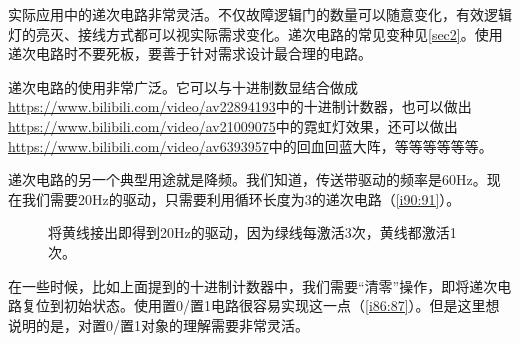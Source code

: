 实际应用中的递次电路非常灵活。不仅故障逻辑门的数量可以随意变化，有效逻辑灯的亮灭、接线方式都可以视实际需求变化。递次电路的常见变种见\autoref{sec2}。使用递次电路时不要死板，要善于针对需求设计最合理的电路。

递次电路的使用非常广泛。它可以与十进制数显结合做成\url{https://www.bilibili.com/video/av22894193}中的十进制计数器，也可以做出\url{https://www.bilibili.com/video/av21009075}中的霓虹灯效果，还可以做出\url{https://www.bilibili.com/video/av6393957}中的回血回蓝大阵，等等等等等等。

递次电路的另一个典型用途就是降频。我们知道，传送带驱动的频率是60Hz。现在我们需要20Hz的驱动，只需要利用循环长度为3的递次电路（\autoref{i90:91}）。

\begin{figure}[!h]
\begin{center}
\end{center}
\caption{将黄线接出即得到20Hz的驱动，因为绿线每激活3次，黄线都激活1次。}
\label{i90:91}
\end{figure}

在一些时候，比如上面提到的十进制计数器中，我们需要“清零”操作，即将递次电路复位到初始状态。使用置0/置1电路很容易实现这一点（\autoref{i86:87}）。但是这里想说明的是，对置0/置1对象的理解需要非常灵活。

